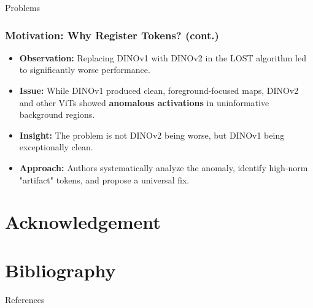 \documentclass[aspectratio=169]{beamer}
\begin{document}
\begin{section}{Problems}
\begin{frame}
\end{frame}

\begin{frame}
\frametitle{Motivation: Why Register Tokens? (cont.)}

\begin{itemize}
    \item \textbf{Observation:} Replacing DINOv1 with DINOv2 in the \textsc{LOST} algorithm led to significantly worse performance.
    \item \textbf{Issue:} While DINOv1 produced clean, foreground-focused maps, DINOv2 and other ViTs showed \textbf{anomalous activations} in uninformative background regions.
    \item \textbf{Insight:} The problem is not DINOv2 being worse, but DINOv1 being exceptionally clean.
    \item \textbf{Approach:} Authors systematically analyze the anomaly, identify high-norm "artifact" tokens, and propose a universal fix.
\end{itemize}
\end{frame}
\end{section}







\section*{Acknowledgement}



\section*{Bibliography}
\appendix

\begin{frame}{References}
    \printbibliography[heading=none]
\end{frame}
\end{document}
